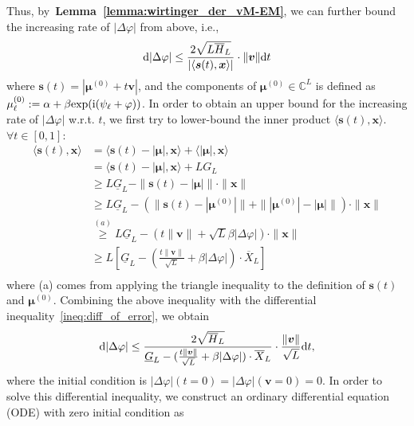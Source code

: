 \documentclass[journal,twocolumn]{IEEEtran}
\theoremstyle{nonumberplain}
\def \exp {\text{exp}}
\def \ri {{\rm i}}
\begin{document}
{Thus, by~{\bf Lemma~\ref{lemma:wirtinger_der_vM-EM}}, we can further bound the increasing rate of $|\Delta\varphi|$ from above, i.e., 
\begin{equation}
    {\rm d}|\Delta\varphi| \leq \frac{2\sqrt{L\overline{H}_L}}{|\langle{\bm s}(t), {\bm x}\rangle|} \cdot \|{\bm v}\|{\rm d}t
    \label{ineq:diff_of_error}
\end{equation}
where ${\bm s}(t) = |{\bm \mu}^{(0)} + t{\bm v}|$, and the components of ${\bm \mu}^{(0)}\in\mathbb{C}^L$ is defined as $\mu_\ell^{(0)}:= \alpha+\beta\exp(\ri (\psi_\ell + \varphi))$. In order to obtain an upper bound for the increasing rate of $|\Delta\varphi|$ w.r.t. $t$, we first try to lower-bound the inner product $\langle{\bm s}(t), {\bm x}\rangle$. $\forall t\in[0,1]$: 
\begin{equation}
    \begin{aligned}
    \langle{\bm s}(t), {\bm x}\rangle &= \langle{\bm s}(t) - |{\bm \mu}|, {\bm x}\rangle + \langle|{\bm\mu}|,{\bm x}\rangle\\
    &= \langle{\bm s}(t) - |{\bm \mu}|, {\bm x}\rangle + LG_L \\
    &\geq L\underline{G}_L-\|{\bm s}(t) - |{\bm \mu}|\|\cdot\|{\bm x}\| \\
    & \geq L\underline{G}_L-(\|{\bm s}(t) - |{\bm \mu}^{(0)}|\|+\||{\bm \mu}^{(0)}| - |{\bm \mu}|\|)\cdot\|{\bm x}\| \\
    &\overset{(a)}{\geq} L\underline{G}_L-(t\|{\bm v}\| + \sqrt{L}\beta|\Delta\varphi|)\cdot\|{\bm x}\| \\
    &\geq L\left[\underline{G}_L-(\frac{t\|{\bm v}\|}{\sqrt{L}}+\beta|\Delta\varphi|)\cdot \overline{X}_L \right]\\
    \end{aligned}
\end{equation}
where (a) comes from applying the triangle inequality to the definition of ${\bm s}(t)$ and ${\bm \mu}^{(0)}$. Combining the above inequality with the differential inequality~\eqref{ineq:diff_of_error}, we obtain 
\begin{equation}
    {\rm d}|\Delta\varphi|\leq \frac{2\sqrt{\overline{H}_L}}{\underline{G}_L-(\frac{t\|{\bm v}\|}{\sqrt{L}}+\beta|\Delta\varphi|)\cdot \overline{X}_L }\cdot \frac{\|{\bm v}\|}{\sqrt{L}} {\rm d}t,
    \label{ineq:increasing-rate-constraint}
\end{equation}
where the initial condition is $|\Delta\varphi|(t=0) = |\Delta\varphi|({\bm v} = 0)=0$. In order to solve this differential inequality, we construct an ordinary differential equation (ODE) with zero initial condition as 
}
\end{document}
